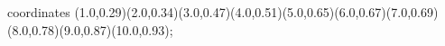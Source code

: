 					coordinates { (1.0,0.29)(2.0,0.34)(3.0,0.47)(4.0,0.51)(5.0,0.65)(6.0,0.67)(7.0,0.69)(8.0,0.78)(9.0,0.87)(10.0,0.93)};